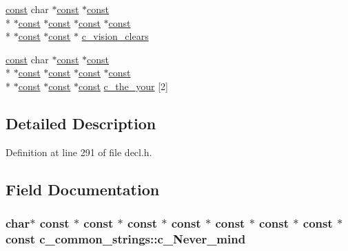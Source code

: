 \begin{DoxyCompactItemize}
\item 
\hyperlink{tradstdc_8h_a2c212835823e3c54a8ab6d95c652660e}{const} char $\ast$\hyperlink{tradstdc_8h_a2c212835823e3c54a8ab6d95c652660e}{const} $\ast$\hyperlink{tradstdc_8h_a2c212835823e3c54a8ab6d95c652660e}{const} \\*
$\ast$\hyperlink{tradstdc_8h_a2c212835823e3c54a8ab6d95c652660e}{const} $\ast$\hyperlink{tradstdc_8h_a2c212835823e3c54a8ab6d95c652660e}{const} $\ast$\hyperlink{tradstdc_8h_a2c212835823e3c54a8ab6d95c652660e}{const} $\ast$\hyperlink{tradstdc_8h_a2c212835823e3c54a8ab6d95c652660e}{const} \\*
$\ast$\hyperlink{tradstdc_8h_a2c212835823e3c54a8ab6d95c652660e}{const} $\ast$\hyperlink{tradstdc_8h_a2c212835823e3c54a8ab6d95c652660e}{const} $\ast$ \hyperlink{structc__common__strings_aad9acac53dcc0289f0aec4c99889d469}{c\+\_\+vision\+\_\+clears}
\item 
\hyperlink{tradstdc_8h_a2c212835823e3c54a8ab6d95c652660e}{const} char $\ast$\hyperlink{tradstdc_8h_a2c212835823e3c54a8ab6d95c652660e}{const} $\ast$\hyperlink{tradstdc_8h_a2c212835823e3c54a8ab6d95c652660e}{const} \\*
$\ast$\hyperlink{tradstdc_8h_a2c212835823e3c54a8ab6d95c652660e}{const} $\ast$\hyperlink{tradstdc_8h_a2c212835823e3c54a8ab6d95c652660e}{const} $\ast$\hyperlink{tradstdc_8h_a2c212835823e3c54a8ab6d95c652660e}{const} $\ast$\hyperlink{tradstdc_8h_a2c212835823e3c54a8ab6d95c652660e}{const} \\*
$\ast$\hyperlink{tradstdc_8h_a2c212835823e3c54a8ab6d95c652660e}{const} $\ast$\hyperlink{tradstdc_8h_a2c212835823e3c54a8ab6d95c652660e}{const} $\ast$\hyperlink{tradstdc_8h_a2c212835823e3c54a8ab6d95c652660e}{const} \hyperlink{structc__common__strings_a97d9b0808dd1b9c2f929a33b3a2d55d7}{c\+\_\+the\+\_\+your} \mbox{[}2\mbox{]}
\end{DoxyCompactItemize}


\subsection{Detailed Description}


Definition at line 291 of file decl.\+h.



\subsection{Field Documentation}
\hypertarget{structc__common__strings_af4f0226e5165fb34d45776477c589ee9}{
\subsubsection[{c\+\_\+\+Never\+\_\+mind}]{ char$\ast$ {\bf const} $\ast$ {\bf const} $\ast$ {\bf const} $\ast$ {\bf const} $\ast$ {\bf const} $\ast$ {\bf const} $\ast$ {\bf const} $\ast$ {\bf const} c\+\_\+common\+\_\+strings\+::c\+\_\+\+Never\+\_\+mind}}\label{structc__common__strings_af4f0226e5165fb34d45776477c589ee9}


